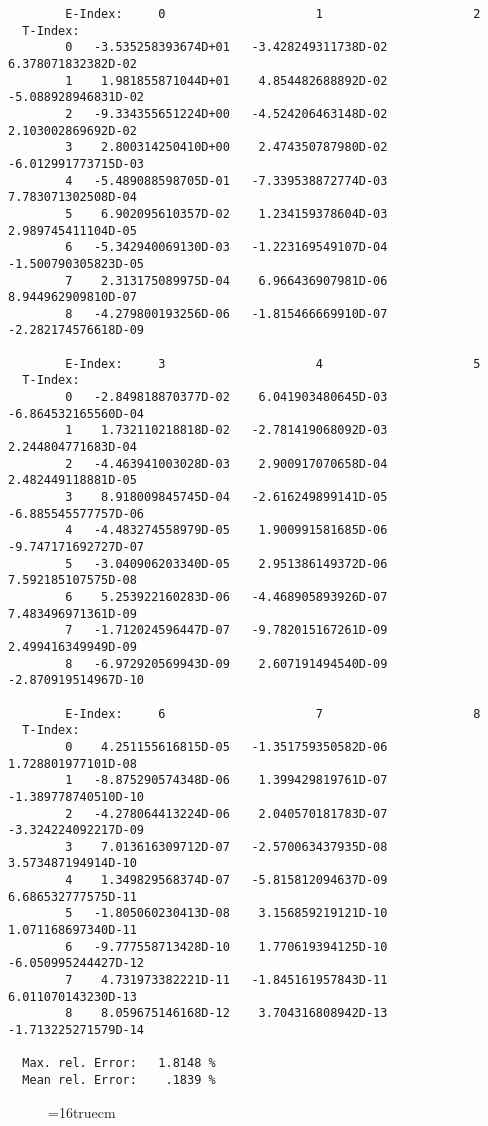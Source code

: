 \documentclass[12pt]{article}
\begin{document}
\begin{small}\begin{verbatim}
        E-Index:     0                     1                     2
  T-Index:
        0   -3.535258393674D+01   -3.428249311738D-02    6.378071832382D-02
        1    1.981855871044D+01    4.854482688892D-02   -5.088928946831D-02
        2   -9.334355651224D+00   -4.524206463148D-02    2.103002869692D-02
        3    2.800314250410D+00    2.474350787980D-02   -6.012991773715D-03
        4   -5.489088598705D-01   -7.339538872774D-03    7.783071302508D-04
        5    6.902095610357D-02    1.234159378604D-03    2.989745411104D-05
        6   -5.342940069130D-03   -1.223169549107D-04   -1.500790305823D-05
        7    2.313175089975D-04    6.966436907981D-06    8.944962909810D-07
        8   -4.279800193256D-06   -1.815466669910D-07   -2.282174576618D-09

        E-Index:     3                     4                     5
  T-Index:
        0   -2.849818870377D-02    6.041903480645D-03   -6.864532165560D-04
        1    1.732110218818D-02   -2.781419068092D-03    2.244804771683D-04
        2   -4.463941003028D-03    2.900917070658D-04    2.482449118881D-05
        3    8.918009845745D-04   -2.616249899141D-05   -6.885545577757D-06
        4   -4.483274558979D-05    1.900991581685D-06   -9.747171692727D-07
        5   -3.040906203340D-05    2.951386149372D-06    7.592185107575D-08
        6    5.253922160283D-06   -4.468905893926D-07    7.483496971361D-09
        7   -1.712024596447D-07   -9.782015167261D-09    2.499416349949D-09
        8   -6.972920569943D-09    2.607191494540D-09   -2.870919514967D-10

        E-Index:     6                     7                     8
  T-Index:
        0    4.251155616815D-05   -1.351759350582D-06    1.728801977101D-08
        1   -8.875290574348D-06    1.399429819761D-07   -1.389778740510D-10
        2   -4.278064413224D-06    2.040570181783D-07   -3.324224092217D-09
        3    7.013616309712D-07   -2.570063437935D-08    3.573487194914D-10
        4    1.349829568374D-07   -5.815812094637D-09    6.686532777575D-11
        5   -1.805060230413D-08    3.156859219121D-10    1.071168697340D-11
        6   -9.777558713428D-10    1.770619394125D-10   -6.050995244427D-12
        7    4.731973382221D-11   -1.845161957843D-11    6.011070143230D-13
        8    8.059675146168D-12    3.704316808942D-13   -1.713225271579D-14

  Max. rel. Error:   1.8148 %
  Mean rel. Error:    .1839 %

\end{verbatim}\end{small}
\begin{figure} \label{2.3.9aer}
\epsfxsize=16truecm
\end{figure}
\newpage
\end{document}
